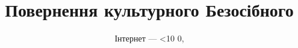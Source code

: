 \title{\Huge Повернення культурного Безосібного}
\date{Інтернет — \ifnum\month<10 0\fi\the\month, \the\year}

\maketitle